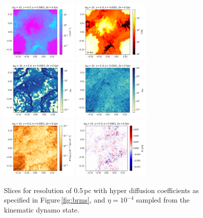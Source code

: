 \documentclass[iop,apj,numberedappendix,twocolappendix]{emulateapj}
\begin{document}
\begin{figure}
\centering
\includegraphics[trim=0.0cm 0.00cm 0.0cm 0.0cm,clip=true,width=0.33\textwidth]{csc_figs/rho05pcPm0e-4_02.png}
\includegraphics[trim=0.0cm 0.00cm 0.0cm 0.0cm,clip=true,width=0.33\textwidth]{csc_figs/tt05pcPm0e-4_02.png}
\includegraphics[trim=0.0cm 0.00cm 0.0cm 0.0cm,clip=true,width=0.33\textwidth]{csc_figs/Pm05pcPm0e-4_02.png}
\includegraphics[trim=0.0cm 0.00cm 0.0cm 0.0cm,clip=true,width=0.33\textwidth]{csc_figs/Rm05pcPm0e-4_02.png}
\includegraphics[trim=0.0cm 0.00cm 0.0cm 0.0cm,clip=true,width=0.33\textwidth]{csc_figs/pb05pcPm0e-4_02.png}
\includegraphics[trim=0.0cm 0.00cm 0.0cm 0.0cm,clip=true,width=0.33\textwidth]{csc_figs/bb105pcPm0e-4_02.png}
\caption{
Slices for resolution of 0.5\,pc with hyper diffusion coefficients as 
specified in Figure\,\ref{fig:brms}, and $\eta=10^{-4}$ sampled from the 
kinematic dynamo state.
\label{fig:05pcUB}
}
\end{figure}
\end{document}
